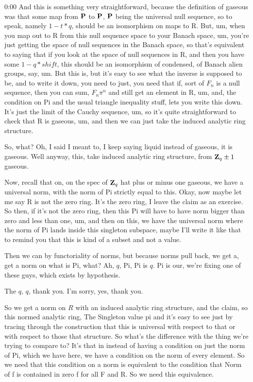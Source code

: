 \begin{unfinished}{0:00}
And this is something very straightforward, because the definition of gaseous was that some map from $\P$ to $\P$, $\P$ being the universal null sequence, so to speak, namely $1 - t * q$, should be an isomorphism on maps to R. But, um, when you map out to R from this null sequence space to your Banach space, um, you're just getting the space of null sequences in the Banach space, so that's equivalent to saying that if you look at the space of null sequences in R, and then you have some $1 - q * shift$, this should be an isomorphism of condensed,  of Banach alien groups, say, um. But this is, but it's easy to see what the inverse is supposed to be, and to write it down, you need to just, you need that if, sort of $F_n$ is a null sequence, then you can sum, $F_n \pi^n$ and still get an element in R, um, and, the condition on Pi and the usual triangle inequality stuff, lets you write this down. It's just the limit of the Cauchy sequence, um, so it's quite straightforward to check that R is gaseous, um, and then we can just take the induced analytic ring structure.

So, what? Oh, I said I meant to, I keep saying liquid instead of gaseous, it is gaseous. Well anyway, this, take induced analytic ring structure, from $\Z_q \pm 1$ gaseous.

Now, recall that on, on the spec of $\Z_q$ hat plus or minus one gaseous, we have a universal norm, with the norm of Pi strictly equal to this. Okay, now maybe let me say R is not the zero ring. It's the zero ring, I leave the claim as an exercise. So then, if it's not the zero ring, then this Pi will have to have norm bigger than zero and less than one, um, and then on this, we have the universal norm where the norm of Pi lands inside this singleton subspace, maybe I'll write it like that to remind you that this is kind of a subset and not a value.

Then we can by functoriality of norms, but because norms pull back, we get a, get a norm on what is Pi, what? Ah, $q$, Pi, Pi is $q$. Pi is our, we're fixing one of these guys, which exists by hypothesis.

The $q$, $q$, thank you. I'm sorry, yes, thank you.

So we get a norm on $R$ with an induced analytic ring structure, and the claim, so this normed analytic ring,
The Singleton value pi and it's easy to see just by tracing through the construction that this is universal with respect to that or with respect to those that structure. So what's the difference with the thing we're trying to compare to? It's that in instead of having a condition on just the norm of Pi, which we have here, we have a condition on the norm of every element. So we need that this condition on a norm is equivalent to the condition that Norm of f is contained in zero f for all F and R. So we need this equivalence.


\end{unfinished}
